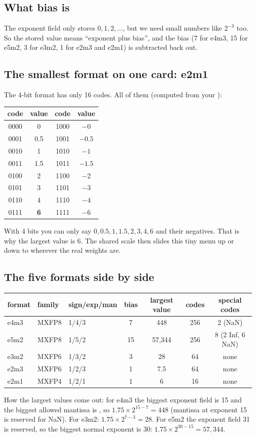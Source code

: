 \subsection{What bias is}
The exponent field only stores $0,1,2,\dots$, but we need small numbers like $2^{-3}$ too. So the stored value means
``exponent plus bias'', and the bias (7 for e4m3, 15 for e5m2, 3 for e3m2, 1 for e2m3 and e2m1) is subtracted
back out.

\subsection{The smallest format on one card: e2m1}
The 4-bit format has only 16 codes. All of them (computed from your ):
\begin{center}
\small
\begin{tabular}{cc@{\hspace{2cm}}cc}
\toprule
code & value & code & value \\
\midrule
0000 & 0 & 1000 & $-0$ \\
0001 & 0.5 & 1001 & $-0.5$ \\
0010 & 1 & 1010 & $-1$ \\
0011 & 1.5 & 1011 & $-1.5$ \\
0100 & 2 & 1100 & $-2$ \\
0101 & 3 & 1101 & $-3$ \\
0110 & 4 & 1110 & $-4$ \\
0111 & \textbf{6} & 1111 & $-6$ \\
\bottomrule
\end{tabular}
\end{center}
With 4 bits you can only say $0, 0.5, 1, 1.5, 2, 3, 4, 6$ and their negatives. That is why the largest value is 6.
The shared scale then slides this tiny menu up or down to wherever the real weights are.

\subsection{The five formats side by side}
\begin{center}
\small
\begin{tabular}{lllcccc}
\toprule
format & family & sign/exp/man & bias & largest value & codes & special codes \\
\midrule
e4m3 & MXFP8 & 1/4/3 & 7  & 448    & 256 & 2 (NaN) \\
e5m2 & MXFP8 & 1/5/2 & 15 & 57{,}344 & 256 & 8 (2 Inf, 6 NaN) \\
e3m2 & MXFP6 & 1/3/2 & 3  & 28     & 64  & none \\
e2m3 & MXFP6 & 1/2/3 & 1  & 7.5    & 64  & none \\
e2m1 & MXFP4 & 1/2/1 & 1  & 6      & 16  & none \\
\bottomrule
\end{tabular}
\end{center}
How the largest values come out: for e4m3 the biggest exponent field is 15 and the biggest allowed mantissa is
, so $1.75\times2^{15-7}=448$ (mantissa  at exponent 15 is reserved for NaN). For e3m2:
$1.75\times2^{7-3}=28$. For e5m2 the exponent field 31 is reserved, so the biggest normal exponent is 30:
$1.75\times2^{30-15}=57{,}344$.

